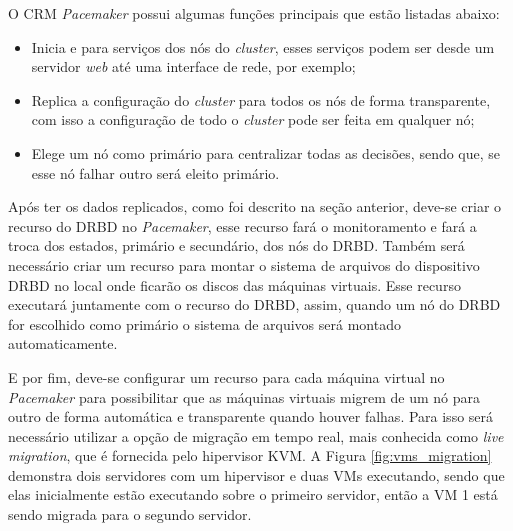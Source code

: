 
O \ac{CRM} \textit{Pacemaker} possui algumas funções principais que estão listadas abaixo:
\begin{itemize}
 \item Inicia e para serviços dos nós do \textit{cluster}, esses serviços podem ser desde um servidor \textit{web} até uma interface de rede, 
 por exemplo;
 \item Replica a configuração do \textit{cluster} para todos os nós de forma transparente, com isso a configuração de todo o \textit{cluster} 
 pode ser feita em qualquer nó;
 \item Elege um nó como primário para centralizar todas as decisões, sendo que, se esse nó falhar outro será eleito primário.
\end{itemize}

Após ter os dados replicados, como foi descrito na seção anterior, deve-se criar o recurso do \ac{DRBD} no \textit{Pacemaker}, esse recurso fará o
monitoramento e fará a troca dos estados, primário e secundário, dos nós do \ac{DRBD}.
Também será necessário criar um recurso para montar o sistema de arquivos do dispositivo \ac{DRBD} no local onde ficarão os discos das máquinas
virtuais. Esse recurso executará juntamente com o recurso do \ac{DRBD}, assim, quando um nó do \ac{DRBD} for escolhido como primário o sistema de
arquivos será montado automaticamente.

E por fim, deve-se configurar um recurso para cada máquina virtual no \textit{Pacemaker} para possibilitar que as
máquinas virtuais migrem de um nó para outro de forma automática e transparente quando houver falhas. Para isso será necessário utilizar a 
opção de migração em tempo real, mais conhecida como \textit{live migration}, que é fornecida pelo hipervisor \ac{KVM}.
A Figura \ref{fig:vms_migration} demonstra dois servidores com um hipervisor e duas \ac{VM}s executando, sendo que elas inicialmente estão 
executando sobre o primeiro servidor, então a \ac{VM} 1 está sendo migrada para o segundo servidor.

